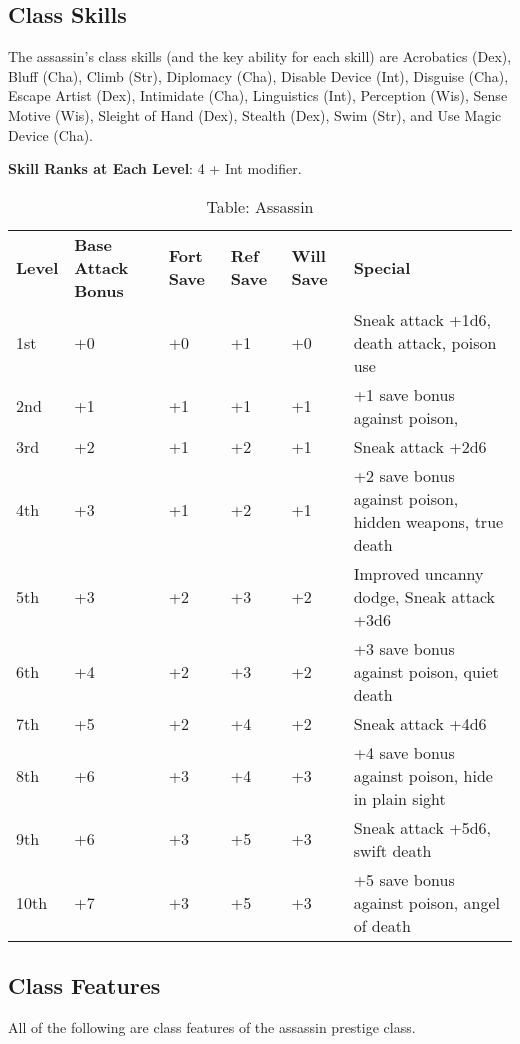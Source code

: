 \subsection{Class Skills}

				
The assassin's class skills (and the key ability for each skill) are Acrobatics (Dex), Bluff (Cha), Climb (Str), Diplomacy (Cha), Disable Device (Int), Disguise (Cha), Escape Artist (Dex), Intimidate (Cha), Linguistics (Int), Perception (Wis), Sense Motive (Wis), Sleight of Hand (Dex), Stealth (Dex), Swim (Str), and Use Magic Device (Cha). 
				
\textbf{ Skill Ranks at Each Level}: 4 + Int modifier.

\begin{table}[]
\sffamily
\caption{Table: Assassin}
\begin{tabular}{llllll}
\textbf{Level} & \textbf{Base Attack Bonus} & \textbf{Fort Save} & \textbf{Ref Save} & \textbf{Will Save} & \textbf{Special}\\
1st & +0 & +0 & +1 & +0 & Sneak attack +1d6, death attack, poison use\\
2nd & +1 & +1 & +1 & +1 & +1 save bonus against poison, \\
3rd & +2 & +1 & +2 & +1 & Sneak attack +2d6\\
4th & +3 & +1 & +2 & +1 & +2 save bonus against poison, hidden weapons, true death \\
5th & +3 & +2 & +3 & +2 & Improved uncanny dodge, Sneak attack +3d6\\
6th & +4 & +2 & +3 & +2 & +3 save bonus against poison, quiet death\\
7th & +5 & +2 & +4 & +2 & Sneak attack +4d6\\
8th & +6 & +3 & +4 & +3 & +4 save bonus against poison, hide in plain sight\\
9th & +6 & +3 & +5 & +3 & Sneak attack +5d6, swift death\\
10th & +7 & +3 & +5 & +3 & +5 save bonus against poison, angel of death\\
\end{tabular}
\end{table}

\subsection{Class Features}

				
All of the following are class features of the assassin prestige class.
				
